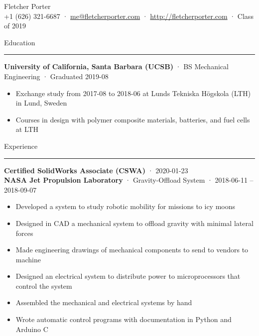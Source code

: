 \documentclass[12pt, oneside]{article}
\newcommand{\titlestyle}[1] {
	{\fontsize{40pt}{1em}\selectfont \textcolor{new_red}{\textsf{#1}}} \\
}
\newcommand{\headingstyleJobs}[1] {
	{\fontsize{18pt}{1em}\selectfont \textcolor{new_red}{\textsf{#1}}}
	\textcolor{new_red}{\rule{3.25in}{0.5pt}} \vspace{3pt}
}
\newcommand{\infostyle}[1] {
	{\selectfont #1} \\ \vspace{10pt}
}
\newcommand{\jobtitle}[3] {
	{\bf #1} · {#2} · {#3} \vspace{-7pt} \\
}
\newcommand{\certification}[2] {
	{\bf #1} · {#2} \vspace{5pt} \\
}
\begin{document}
\begin{flushleft}



\titlestyle{Fletcher Porter}
\infostyle{+1 (626) 321-6687 · \href{mailto:me@fletcherporter.com}{me@fletcherporter.com} · \url{http://fletcherporter.com} · Class of 2019}


\headingstyleJobs{Education}

\jobtitle{University of California, Santa Barbara (UCSB)}{BS Mechanical Engineering}{Graduated 2019-08}
\begin{itemize}
	\item Exchange study from 2017-08 to 2018-06 at Lunds Tekniska Högskola (LTH) in Lund, Sweden \\
	\item Courses in design with polymer composite materials, batteries, and fuel cells at LTH
\end{itemize}



\headingstyleJobs{Experience}

\certification{Certified SolidWorks Associate (CSWA)}{2020-01-23}

\jobtitle{NASA Jet Propulsion Laboratory}{Gravity-Offload System}{2018-06-11 – 2018-09-07}
\begin{itemize}
	\item Developed a system to study robotic mobility for missions to icy moons \\
	\item Designed in CAD a mechanical system to offload gravity with minimal lateral forces \\
	\item Made engineering drawings of mechanical components to send to vendors to machine \\
	\item Designed an electrical system to distribute power to microprocessors that control the system \\
	\item Assembled the mechanical and electrical systems by hand \\
	\item Wrote automatic control programs with documentation in Python and Arduino C
\end{itemize}


\end{flushleft}
\end{document}

